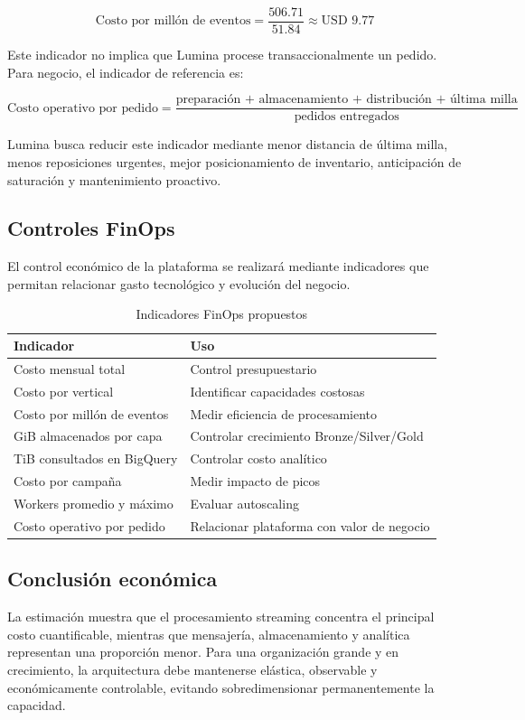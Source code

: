 \documentclass[11pt,a4paper]{article}
\begin{document}
\[
\text{Costo por millón de eventos}
=
\frac{506.71}{51.84}
\approx \text{USD }9.77
\]

Este indicador no implica que Lumina procese transaccionalmente un pedido. Para negocio, el indicador de referencia es:

\[
\text{Costo operativo por pedido}
=
\frac{\text{preparación + almacenamiento + distribución + última milla}}
{\text{pedidos entregados}}
\]

Lumina busca reducir este indicador mediante menor distancia de última milla, menos reposiciones urgentes, mejor posicionamiento de inventario, anticipación de saturación y mantenimiento proactivo.

\subsection{Controles FinOps}
El control económico de la plataforma se realizará mediante indicadores que permitan relacionar gasto tecnológico y evolución del negocio.

\begin{table}[H]
\caption{Indicadores FinOps propuestos}\label{tab:finops-costos}
\small
\begin{tabularx}{\linewidth}{@{}P{.43\linewidth}Y@{}}\toprule
Indicador & Uso\\\midrule
Costo mensual total & Control presupuestario\\
Costo por vertical & Identificar capacidades costosas\\
Costo por millón de eventos & Medir eficiencia de procesamiento\\
GiB almacenados por capa & Controlar crecimiento Bronze/Silver/Gold\\
TiB consultados en BigQuery & Controlar costo analítico\\
Costo por campaña & Medir impacto de picos\\
Workers promedio y máximo & Evaluar autoscaling\\
Costo operativo por pedido & Relacionar plataforma con valor de negocio\\\bottomrule
\end{tabularx}
\end{table}

\subsection{Conclusión económica}
La estimación muestra que el procesamiento streaming concentra el principal costo cuantificable, mientras que mensajería, almacenamiento y analítica representan una proporción menor. Para una organización grande y en crecimiento, la arquitectura debe mantenerse elástica, observable y económicamente controlable, evitando sobredimensionar permanentemente la capacidad.
\end{document}
